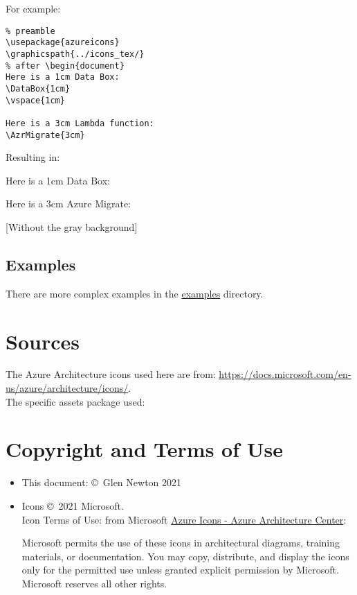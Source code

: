 \documentclass[12pt]{article}
\begin{document}
\noindent For example:
\vspace{4mm}

\begin{blockquote}
\begin{verbatim}
% preamble
\usepackage{azureicons} 
\graphicspath{../icons_tex/}
% after \begin{document}
Here is a 1cm Data Box:
\DataBox{1cm}
\vspace{1cm}

Here is a 3cm Lambda function:
\AzrMigrate{3cm}

\end{verbatim}
\end{blockquote}

\noindent Resulting in:\\
\begin{blockquote}
  Here is a 1cm Data Box:
\DataBox{1cm}

\vspace{1cm}
Here is a 3cm Azure Migrate:
\AzrMigrate{3cm}
\end{blockquote}

[Without the gray background]
    
\subsection{Examples}
There are more complex examples in the \href{https://github.com/gnewton/azureArchIcons2LaTeX/tree/main/examples}{examples} directory.

  
\section{Sources}
The Azure Architecture icons used here are from: \url{https://docs.microsoft.com/en-us/azure/architecture/icons/}.\\
The specific assets package used: \href{https://arch-center.azureedge.net/icons/\assetZipFile}{\assetZipFileSplit}



\section{Copyright and Terms of Use}

\begin{itemize}
\item This document: \copyright\ Glen Newton 2021
\item Icons \copyright \ 2021 Microsoft.\\
  Icon Terms of Use: from Microsoft \href{https://docs.microsoft.com/en-us/azure/architecture/icons/}{Azure Icons - Azure Architecture Center}:\\
  {\em
\begin{blockquote}
    Microsoft permits the use of these icons in architectural diagrams,
    training materials, or documentation. You may copy, distribute, and
    display the icons only for the permitted use unless granted explicit
    permission by Microsoft. Microsoft reserves all other rights.
\end{blockquote}
}
\end{itemize}
\end{document}
